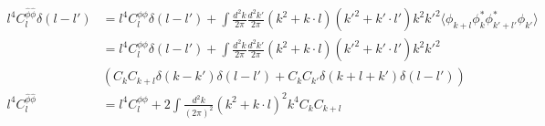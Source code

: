 \documentclass[noinfoline]{imsart}
\newcommand{\pinv}{\hat\phi}
\begin{document}
\begin{align}
   l^4 C_l^{\pinv\pinv} \delta(l-l')
   &= l^4 C_l^{\phi\phi} \delta(l-l')
   + \int\frac{d^2k}{2\pi}\frac{d^2k'}{2\pi} (k^2+k\cdot l)(k'^2+k'\cdot l') k^2 k'^2
   \langle \phi_{k+l}\phi_k^*\phi_{k'+l'}^*\phi_{k'} \rangle \nonumber\\
   &=l^4 C_l^{\phi\phi} \delta(l-l')
   + \int\frac{d^2k}{2\pi}\frac{d^2k'}{2\pi} (k^2+k\cdot l)(k'^2+k'\cdot l') k^2 k'^2\nonumber\\
   &\left( C_k C_{k+l} \delta(k-k')\delta(l-l') + C_k C_{k'} \delta(k+l+k')\delta(l-l') \right)\nonumber\\
  l^4 C_l^{\pinv\pinv} &=l^4 C_l^{\phi\phi}  + 2 \int\frac{d^2k}{(2\pi)^2}(k^2+k\cdot l)^2 k^4 C_k C_{k+l}
\end{align}
\end{document}
